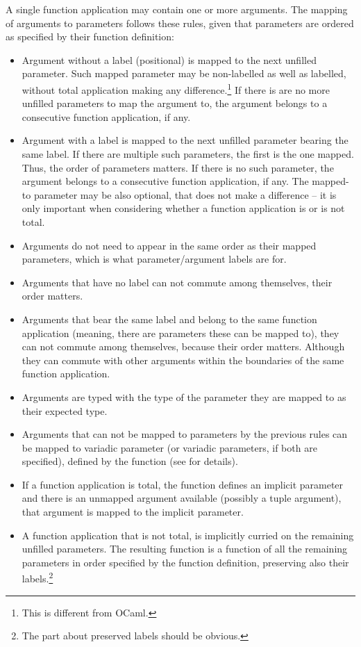 A single function application may contain one or more arguments. The mapping of arguments to parameters follows these rules, given that parameters are ordered as specified by their function definition:
\begin{itemize}
  \item Argument without a label (positional) is mapped to the next unfilled parameter. Such mapped parameter may be non-labelled as well as labelled, without total application making any difference.\footnote{This is different from OCaml.} If there is are no more unfilled parameters to map the argument to, the argument belongs to a consecutive function application, if any. 
  \item Argument with a label is mapped to the next unfilled parameter bearing the same label. If there are multiple such parameters, the first is the one mapped. Thus, the order of parameters matters. If there is no such parameter, the argument belongs to a consecutive function application, if any. The mapped-to parameter may be also optional, that does not make a difference -- it is only important when considering whether a function application is or is not total. 
  \item Arguments do not need to appear in the same order as their mapped parameters, which is what parameter/argument labels are for. 
  \item Arguments that have no label can not commute among themselves, their order matters. 
  \item Arguments that bear the same label and belong to the same function application (meaning, there are parameters these can be mapped to), they can not commute among themselves, because their order matters. Although they can commute with other arguments within the boundaries of the same function application. 
  \item Arguments are typed with the type of the parameter they are mapped to as their expected type. 
  \item Arguments that can not be mapped to parameters by the previous rules can be mapped to variadic parameter (or variadic parameters, if both are specified), defined by the function (see  for details). 
  \item If a function application is total, the function defines an implicit parameter and there is an unmapped argument available (possibly a tuple argument), that argument is mapped to the implicit parameter. 
  \item A function application that is not total, is implicitly curried on the remaining unfilled parameters. The resulting function is a function of all the remaining parameters in order specified by the function definition, preserving also their labels.\footnote{The part about preserved labels should be obvious.}

\end{itemize}
